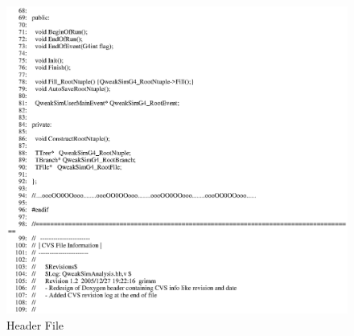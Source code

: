 \begin{figure}[h]
  \hspace{0cm}
  \includegraphics[scale=0.8]{./figures13/QweakSimAnalysis.hh-p2.eps}
  \caption{Header File}
           \label{fig:XIII-SC-2}
\end{figure}

\clearpage

